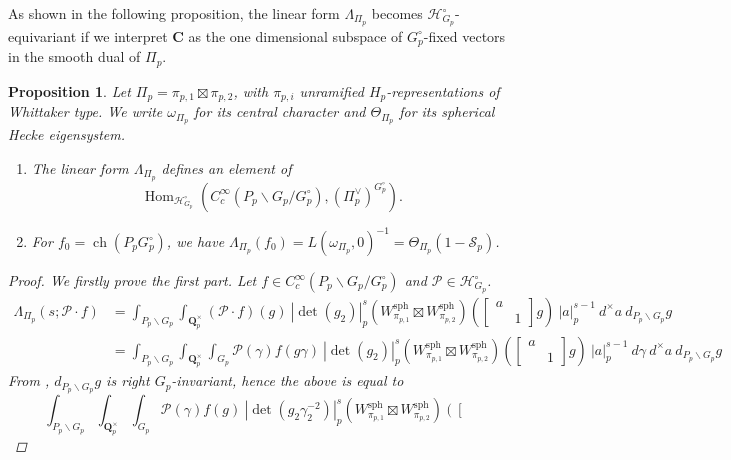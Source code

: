 \documentclass{amsart}%
\theoremstyle{plain}
\newtheorem{prop}[thm]{Proposition}
\theoremstyle{plain}
\theoremstyle{remark}
\DeclareMathOperator{\ch}{ch}
\DeclareMathOperator{\Hom}{Hom}
\begin{document}
As shown in the following proposition, the linear form $\Lambda_{\Pi_p}$ becomes $\mathcal{H}_{G_p}^\circ$-equivariant if we interpret $\mathbf{C}$ as the one dimensional subspace of $G_p^\circ$-fixed vectors in the smooth dual of $\Pi_p$.
\begin{prop}\label{prop equivariance of linear form} Let $\Pi_p=\pi_{p,1}\boxtimes \pi_{p,2}$, with $\pi_{p,i}$ unramified $H_p$-representations of Whittaker type. We write $\omega_{\Pi_p}$ for its central character and $\Theta_{\Pi_p}$ for its spherical Hecke eigensystem.
    \begin{enumerate}
    \item The linear form $\Lambda_{\Pi_p}$ defines an element of $$\Hom_{\mathcal{H}_{G_p}^\circ}\left(C_c^\infty (P_p\backslash G_p/G_p^\circ), \left(\Pi_p^\vee\right)^{G_p^\circ}\right).$$
        \item For $f_0=\ch(P_pG_p^\circ)$, we have $\Lambda_{\Pi_p}\left(f_0\right)=L(\omega_{\Pi_p},0)^{-1}=\Theta_{\Pi_p}(1-\mathcal{S}_p)$. 
    \end{enumerate}
    \begin{proof}
        We firstly prove the first part. Let $f\in C_c^\infty(P_p\backslash G_p/G_p^\circ)$ and $\mathcal{P}\in \mathcal{H}_{G_p}^\circ$.
        \begin{align*}
            \Lambda_{\Pi_p}(s;\mathcal{P}\cdot f)&=\int_{P_p\backslash G_p}\int_{\mathbf{Q}_p^\times} (\mathcal{P}\cdot f)(g)\ |\det(g_2)|_p^s\left(W_{\pi_{p,1}}^\mathrm{sph}\boxtimes W_{\pi_{p,2}}^\mathrm{sph}\right)\left(\left[\begin{smallmatrix}
                a & \\
                & 1
            \end{smallmatrix}\right]g\right)\ |a|_p^{s-1}\ d^\times a\ d_{P_p\backslash G_p}g\\
            &= \int_{P_p\backslash G_p}\int_{\mathbf{Q}_p^\times} \int_{G_p} \mathcal{P}(\gamma) f(g\gamma)\ |\det(g_2)|_p^s\left(W_{\pi_{p,1}}^\mathrm{sph}\boxtimes W_{\pi_{p,2}}^\mathrm{sph}\right)\left(\left[\begin{smallmatrix}
                a & \\
                & 1
            \end{smallmatrix}\right]g\right)\ |a|_p^{s-1}\ d\gamma \ d^\times a\ d_{P_p\backslash G_p}g
        \end{align*}
        From , $d_{P_p\backslash G_p}g$ is right $G_p$-invariant, hence the above is equal to
        $$ \int_{P_p\backslash G_p}\int_{\mathbf{Q}_p^\times} \int_{G_p} \mathcal{P}(\gamma) f(g)\ |\det(g_2\gamma_2^{-2})|_p^s\left(W_{\pi_{p,1}}^\mathrm{sph}\boxtimes W_{\pi_{p,2}}^\mathrm{sph}\right)\left(\left[\begin{smallmatrix}

\end{smallmatrix}$$
\end{proof}
\end{prop}
\end{document}
